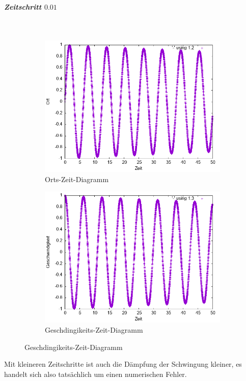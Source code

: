\documentclass[
    oneside,
    ngerman,
    footinclude=false,
    captions=tableheading,
    DIV=12
]{scrartcl}
\begin{document}
            \subparagraph*{Zeitschritt $0.01$}\,
            \begin{figure}[H]
                \centering
                \begin{subfigure}[b]{0.45\textwidth}
                    \centering
                    \includegraphics[width=\textwidth]{Bilddateien/LLA1(a)-001-0-x.png}
                    \caption{Orts-Zeit-Diagramm}
                    \label{fig:LLA1(a)-001-0-x}
                \end{subfigure}
                \hfill
                \begin{subfigure}[b]{0.45\textwidth}
                    \centering
                    \includegraphics[width=\textwidth]{Bilddateien/LLA1(a)-001-0-v.png}
                    \caption{Geschdingikeits-Zeit-Diagramm}
                    \label{fig:LLA1(a)-001-0-v}
                \end{subfigure}
            \end{figure}
            Mit kleineren Zeitschritte ist auch die Dämpfung der Schwingung kleiner, es handelt sich also tatsächlich um einen numerischen Fehler.
            
\end{document}
